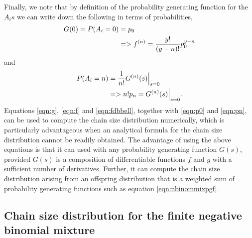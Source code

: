\documentclass{imammb}
\numberwithin{equation}{section}
\begin{document}
Finally, we note that by definition of the probability generating function for the $A_is$ we can write down the following in terms of probabilities,
\begin{align}\label{eqn:p0}
   G(0) =  P(A_i=0) &= p_0 \notag \\
    &=> f^{(n)}= \frac{y!}{(y-n)!} p_0^{y-n} 
\end{align}
and
\begin{align}\label{eqn:pn}
    P(A_i=n) &= \frac{1}{n!} G^{(n)}(s)\Bigr|_{s=0} \notag \\
    &=> n! p_n = G^{(n)}(s)\Bigr|_{s=0}.
\end{align}
Equations \eqref{eqn:g}, \eqref{eqn:f} and \eqref{eqn:fdbbell}, together with \eqref{eqn:p0} and \eqref{eqn:pn}, can be used to compute the chain size distribution numerically, which is particularly advantageous when an analytical formula for the chain size distribution cannot be readily obtained. The advantage of using the above equations is that it can used with any probability generating function $G(s)$, provided $G(s)$ is a composition of differentiable functions $f$ and $g$ with a sufficient number of derivatives. Further, it can compute the chain size distribution arising from an offspring distribution that is a weighted sum of probability generating functions such as equation \eqref{eqn:nbinommixpgf}. 

\subsection{Chain size distribution for the finite negative binomial mixture}
\end{document}
